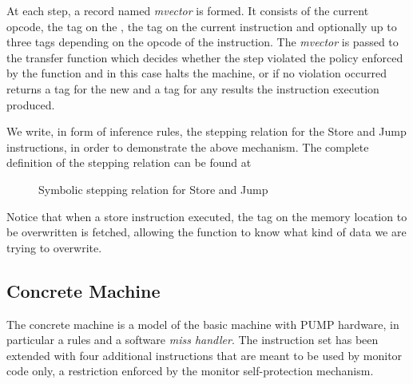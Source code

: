 At each step, a record named \emph{mvector} is formed. It consists of the 
current opcode, the tag on the \pc, the tag on the current instruction and 
optionally up to three tags depending on the opcode of the instruction.
The \emph{mvector} is passed to the transfer function
which decides whether the step violated the policy enforced by the \TRANSFER
function and in this case halts the machine, or if no violation occurred returns
a tag for the new \pc and a tag for any results the instruction execution 
produced.

We write, in form of inference rules, the stepping relation for the Store and 
Jump instructions, in order to demonstrate the above mechanism. The complete
definition of the stepping relation can be found at 

\begin{figure}[!htpb]
\bigskip

\caption{Symbolic stepping relation for Store and Jump}
\end{figure}

Notice that when a store instruction executed, the tag on the memory location to
be overwritten is fetched, allowing the \TRANSFER function to know what kind of
data we are trying to overwrite.

\subsection{Concrete Machine}\label{sec:concrete}

The concrete machine is a model of the basic machine with PUMP hardware, 
in particular a rules \cache and a software \emph{miss handler}. 
The instruction set has been extended with four additional instructions that 
are meant to be used by monitor code only, a restriction enforced by the monitor
self-protection mechanism.

